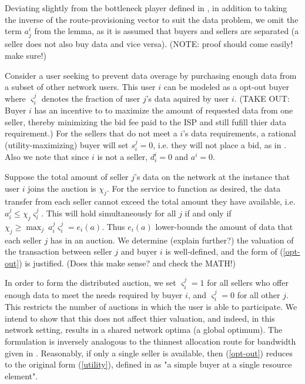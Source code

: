 \documentclass[12pt]{article}
\theoremstyle{definition}
\newcommand{\vs}{\varsigma}
\begin{document}
\begin{multicols}{2}
Deviating slightly from the
bottleneck player defined in \cite{semret}, in addition to taking the inverse
of the route-provisioning vector to suit the data problem, we omit the term $a_j^i$ from the lemma, as it is
assumed that buyers and sellers are separated (a seller does not also buy data
and vice versa).
(NOTE: proof should come easily! make sure!)

Consider a user seeking to prevent
data overage by purchasing enough data from a subset of other network users.
This user $i$ can be modeled as a opt-out buyer where $\vs_i^j$ denotes the
fraction of user $j$'s data aquired by user $i$. (TAKE OUT: Buyer $i$ has an incentive to
to maximize the amount of requested data from one seller, thereby minimizing
the bid fee paid to the ISP and still fufill thier data requirement.)
For the sellers that do not meet a $i$'s data requirements, a rational (utility-maximizing) buyer will
set $s_i^j = 0$, i.e. they will not place a bid, as in \cite{zheng}. Also we
note that since $i$ is not a seller, $d_i^i = 0$ and $a^i = 0$.

Suppose the total amount of seller $j$'s data on the network at the instance that
user $i$ joins the auction is $\chi_j$. For the service to function as desired,
the data transfer from each seller cannot exceed the total amount they have available,
i.e. $a_i^j \le \chi_j\vs_i^j$. This will hold simultaneously for all $j$ if
and only if $\chi_j \ge \max_j \ a_i^j \vs_i^j = e_i(a)$. Thus $e_i(a)$
lower-bounds the amount of data that each seller $j$ has in an auction. We
determine (explain further?) the
valuation of the transaction between seller $j$ and buyer $i$ is well-defined,
and the form of (\ref{opt-out}) is justified. (Does this make sense? and check
the MATH!)

In order to form the distributed auction, we set $\vs_i^j=1$ for all sellers
who offer enough data to meet the needs required by buyer $i$, and $\vs_i^j=0$ for
all other $j$. This restricts the number of auctions in which the user is able to
participate. We intend to show that this does not affect thier valuation, and
indeed, in this network setting, results in a shared network optima (a
global optimum). The formulation is inversely analogous to the thinnest allocation route for
bandwidth given in \cite{lazar}. Reasonably, if only a single seller is available, then
(\ref{opt-out}) reduces to the original form (\ref{utility}), defined in
\cite{semret} as "a simple buyer at a single resource element".


\end{multicols}
\end{document}
